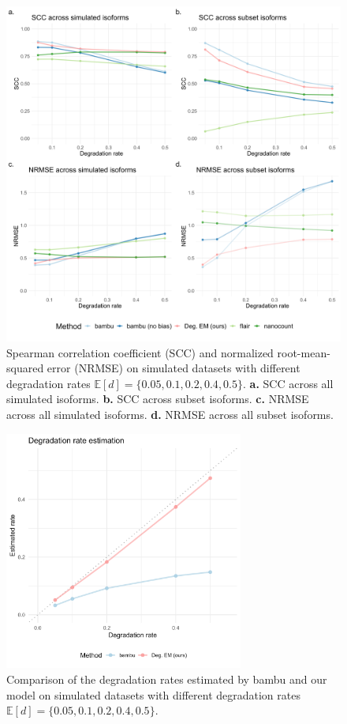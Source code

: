 \begin{figure}[H]
    \centering
    \includegraphics[width=\textwidth]{figures/sec-3-scc-nrmse.png}
    \caption[Empirical results for SCC and NRMSE on simulated datasets]{Spearman correlation coefficient (SCC) and normalized root-mean-squared error (NRMSE) on simulated datasets with different degradation rates $\mathbb{E}[d]=\{0.05,0.1,0.2,0.4,0.5\}$. \textbf{a.} SCC across all simulated isoforms. \textbf{b.} SCC across subset isoforms. \textbf{c.} NRMSE across all simulated isoforms. \textbf{d.} NRMSE across all subset isoforms.}
    \label{fig:sec-3-scc-nrmse}
\end{figure}

\begin{figure}[H]
    \centering
    \includegraphics[width=0.7\textwidth]{figures/sec-3-deg-est.png}
    \caption[Empirical results for degradation rate estimation on simulated datasets]{Comparison of the degradation rates estimated by bambu and our model on simulated datasets with different degradation rates $\mathbb{E}[d]=\{0.05,0.1,0.2,0.4,0.5\}$.}
    \label{fig:sec-3-deg-est}
\end{figure}


